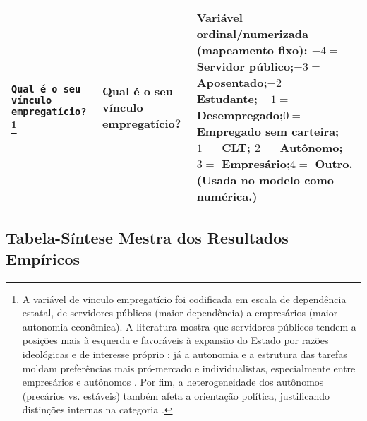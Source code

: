 \begin{apendicesenv}
\begin{longtable}{@{}%
  >{\raggedright\arraybackslash}p{4cm}%
  >{\raggedright\arraybackslash}p{4cm}%
  >{\raggedright\arraybackslash}p{7cm}@{}}
    \texttt{Qual é o seu vínculo empregatício?}\footnote{A variável de vinculo empregatício foi codificada em escala de dependência estatal, de servidores públicos (maior dependência) a empresários (maior autonomia econômica). A literatura mostra que servidores públicos tendem a posições mais à esquerda e favoráveis à expansão do Estado por razões ideológicas e de interesse próprio \cite{jensen2009political}; já a autonomia e a estrutura das tarefas moldam preferências mais pró-mercado e individualistas, especialmente entre empresários e autônomos \cite{kitschelt2014occupations}. Por fim, a heterogeneidade dos autônomos (precários vs. estáveis) também afeta a orientação política, justificando distinções internas na categoria \cite{jansen2016self}.} &
    Qual é o seu vínculo empregatício? &
    Variável ordinal/numerizada (mapeamento fixo): \newline
    $-4=$ Servidor público;\quad $-3=$ Aposentado;\quad $-2=$ Estudante;\newline
    $-1=$ Desempregado;\quad $0=$ Empregado sem carteira;\quad $1=$ CLT;\newline
    $2=$ Autônomo;\quad $3=$ Empresário;\quad $4=$ Outro. \newline
    (Usada no modelo como numérica.) \\ \hline

\end{longtable}

\begin{landscape}

\chapter{Tabela-Síntese Mestra dos Resultados Empíricos}
\label{apendice:tabela_sintese}

\begingroup
\scriptsize
\setlength{\tabcolsep}{3.5pt}


\end{landscape}
\end{apendicesenv}
